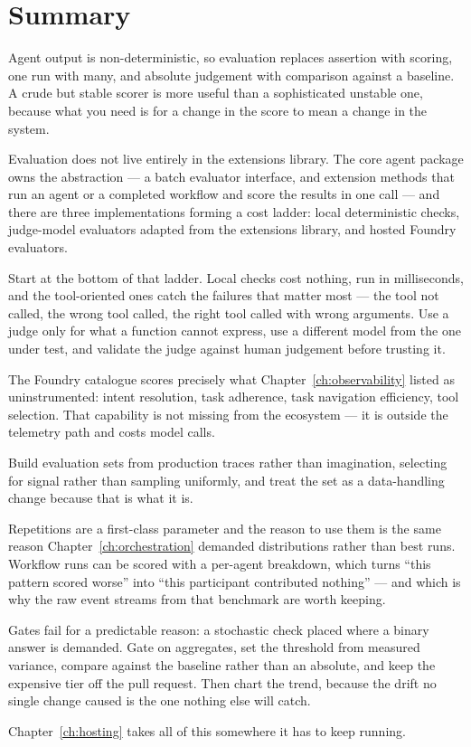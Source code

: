 \section{Summary}

Agent output is non-deterministic, so evaluation replaces assertion with scoring,
one run with many, and absolute judgement with comparison against a baseline. A
crude but stable scorer is more useful than a sophisticated unstable one, because
what you need is for a change in the score to mean a change in the system.

Evaluation does not live entirely in the extensions library. The core agent
package owns the abstraction --- a batch evaluator interface, and extension
methods that run an agent or a completed workflow and score the results in one
call --- and there are three implementations forming a cost ladder: local
deterministic checks, judge-model evaluators adapted from the extensions library,
and hosted Foundry evaluators.

Start at the bottom of that ladder. Local checks cost nothing, run in
milliseconds, and the tool-oriented ones catch the failures that matter most ---
the tool not called, the wrong tool called, the right tool called with wrong
arguments. Use a judge only for what a function cannot express, use a different
model from the one under test, and validate the judge against human judgement
before trusting it.

The Foundry catalogue scores precisely what Chapter~\ref{ch:observability} listed
as uninstrumented: intent resolution, task adherence, task navigation efficiency,
tool selection. That capability is not missing from the ecosystem --- it is
outside the telemetry path and costs model calls.

Build evaluation sets from production traces rather than imagination, selecting
for signal rather than sampling uniformly, and treat the set as a data-handling
change because that is what it is.

Repetitions are a first-class parameter and the reason to use them is the same
reason Chapter~\ref{ch:orchestration} demanded distributions rather than best
runs. Workflow runs can be scored with a per-agent breakdown, which turns ``this
pattern scored worse'' into ``this participant contributed nothing'' --- and
which is why the raw event streams from that benchmark are worth keeping.

Gates fail for a predictable reason: a stochastic check placed where a binary
answer is demanded. Gate on aggregates, set the threshold from measured variance,
compare against the baseline rather than an absolute, and keep the expensive tier
off the pull request. Then chart the trend, because the drift no single change
caused is the one nothing else will catch.

Chapter~\ref{ch:hosting} takes all of this somewhere it has to keep running.
